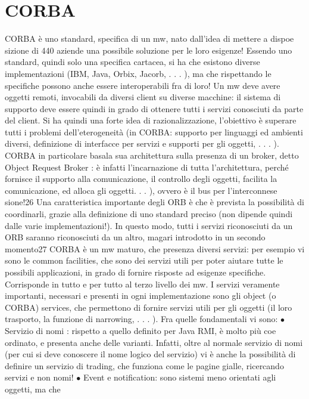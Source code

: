 \section{CORBA}
CORBA è uno standard, specifica di un mw, nato dall'idea di mettere a dispoe
sizione di 440 aziende una possibile soluzione per le loro esigenze!
Essendo uno standard, quindi solo una specifica cartacea, si ha che esistono
diverse implementazioni (IBM, Java, Orbix, Jacorb, . . . ), ma che rispettando le
specifiche possono anche essere interoperabili fra di loro!
Un mw deve avere oggetti remoti, invocabili da diversi client su diverse macchine: il sistema di supporto deve essere
quindi in grado di ottenere tutti i servizi
conosciuti da parte del client. Si ha quindi una forte idea di razionalizzazione,
l'obiettivo è superare tutti i problemi dell'eterogeneità (in CORBA: supporto
per linguaggi ed ambienti diversi, definizione di interfacce per servizi e supporti
per gli oggetti, . . . ).
CORBA in particolare basala sua architettura sulla presenza di un broker,
detto Object Request Broker : è infatti l'incarnazione di tutta l'architettura,
perché fornisce il supporto alla comunicazione, il controllo degli oggetti, facilita
la comunicazione, ed alloca gli oggetti. . . ), ovvero è il bus per l'interconnese
sione!26 Una caratteristica importante degli ORB è che è prevista la possibilità
di coordinarli, grazie alla definizione di uno standard preciso (non dipende quindi dalle varie implementazioni!). In
questo modo, tutti i servizi riconosciuti da
un ORB saranno riconosciuti da un altro, magari introdotto in un secondo
momento27
CORBA è un mw maturo, che presenza diversi servizi: per esempio vi sono
le common facilities, che sono dei servizi utili per poter aiutare tutte le possibili
applicazioni, in grado di fornire risposte ad esigenze specifiche. Corrisponde in
tutto e per tutto al terzo livello dei mw.
I servizi veramente importanti, necessari e presenti in ogni implementazione
sono gli object (o CORBA) services, che permettono di fornire servizi utili per gli
oggetti (il loro trasporto, la funzione di narrowing, . . . ). Fra quelle fondamentali
vi sono:
$\bullet$ Servizio di nomi : rispetto a quello definito per Java RMI, è molto più coe
ordinato, e presenta anche delle varianti. Infatti, oltre al normale servizio
di nomi (per cui si deve conoscere il nome logico del servizio) vi è anche la
possibilità di definire un servizio di trading, che funziona come le pagine
gialle, ricercando servizi e non nomi!
$\bullet$ Event e notification: sono sistemi meno orientati agli oggetti, ma che
